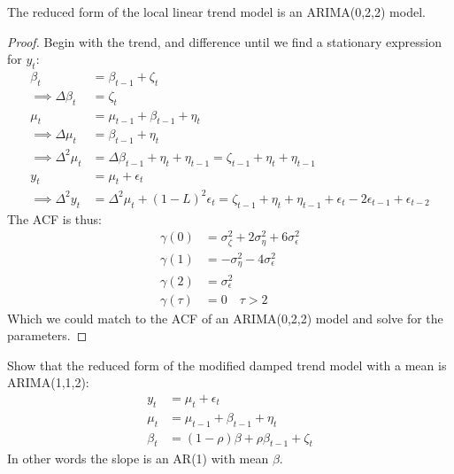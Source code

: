 \documentclass[DIV=14,titlepage=false]{scrreprt}
\begin{document}
\begin{claim}
    The reduced form of the local linear trend model is an ARIMA(0,2,2) model.
\end{claim} 
\begin{proof}
    Begin with the trend, and difference until we find a stationary expression for $y_t$:
    \begin{align*}
        \beta_t &= \beta_{t-1} + \zeta_t\\
        \implies \Delta \beta_t &= \zeta_t\\
        \mu_t &= \mu_{t-1} + \beta_{t-1} + \eta_t\\
        \implies \Delta \mu_t &= \beta_{t-1} + \eta_t\\
        \implies \Delta^2 \mu_t &= \Delta \beta_{t-1} + \eta_t + \eta_{t-1} = \zeta_{t-1} + \eta_t + \eta_{t-1}\\
        y_t &= \mu_t + \epsilon_t\\
        \implies \Delta^2 y_t &= \Delta^2 \mu_t + (1-L)^2 \epsilon_t = \zeta_{t-1} + \eta_t + \eta_{t-1} + \epsilon_t - 2\epsilon_{t-1} + \epsilon_{t-2}
    \end{align*}
    The ACF is thus:
    \begin{align*}
        \gamma(0) &= \sigma^2_\zeta + 2\sigma^2_\eta + 6\sigma^2_\epsilon\\
        \gamma(1) &= -\sigma^2_\eta -4\sigma^2_\epsilon\\
        \gamma(2) &= \sigma^2_\epsilon\\
        \gamma(\tau) &= 0 \quad \tau > 2
    \end{align*}
    Which we could match to the ACF of an ARIMA(0,2,2) model and solve for the parameters.
\end{proof}
\begin{question}
    Show that the reduced form of the modified damped trend model with a mean is ARIMA(1,1,2):
    \begin{align*}
        y_t &= \mu_t + \epsilon_t\\
        \mu_t &= \mu_{t-1} + \beta_{t-1} + \eta_t\\
        \beta_t &= (1-\rho)\beta + \rho \beta_{t-1} + \zeta_t
    \end{align*}
    In other words the slope is an AR(1) with mean $\beta$.
\end{question}
\end{document}
